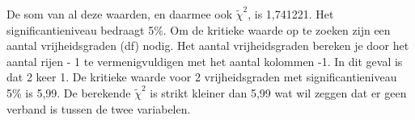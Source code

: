 De som van al deze waarden, en daarmee ook $\tilde\chi^2$, is 1,741221. Het significantieniveau bedraagt 5\%. Om de kritieke waarde op te zoeken zijn een aantal vrijheidsgraden (df) nodig. Het aantal vrijheidsgraden bereken je door het aantal rijen - 1 te vermenigvuldigen met het aantal kolommen  -1. In dit geval is dat 2 keer 1. De kritieke waarde voor 2 vrijheidsgraden met significantieniveau 5\% is 5,99. De berekende $\tilde\chi^2$ is strikt kleiner dan 5,99 wat wil zeggen dat er geen verband is tussen de twee variabelen.

